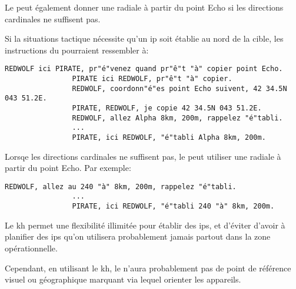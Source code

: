 \begin{e1}
\begin{e2}
\begin{e3}
			Le \ja{} peut également donner une radiale à partir du point Echo si les directions cardinales ne suffisent pas.
			
			
			\begin{e4}
				
				\begin{minipage}{\linewidth}
				\item Si la situations tactique nécessite qu'un \gls{ip} soit établie au nord de la cible, les instructions du \ja{} pourraient ressembler à:
				
				\begin{lstlisting}[caption=Keyhole: directions cardinale, label=keyholecard]
				REDWOLF ici PIRATE, pr"é"venez quand pr"ê"t "à" copier point Echo.
				PIRATE ici REDWOLF, pr"ê"t "à" copier.
				REDWOLF, coordonn"é"es point Echo suivent, 42 34.5N 043 51.2E.
				PIRATE, REDWOLF, je copie 42 34.5N 043 51.2E.
				REDWOLF, allez Alpha 8km, 200m, rappelez "é"tabli.
				...
				PIRATE, ici REDWOLF, "é"tabli Alpha 8km, 200m.
				\end{lstlisting}
				\end{minipage}
				
				\begin{minipage}{\linewidth}
				\item Lorsqe les directions cardinales ne suffisent pas, le \ja{} peut utiliser une radiale à partir du point Echo. Par exemple:
				
				\begin{lstlisting}[caption=Keyhole: radiale, label=keyholerad]
				REDWOLF, allez au 240 "à" 8km, 200m, rappelez "é"tabli.
				...
				PIRATE, ici REDWOLF, "é"tabli 240 "à" 8km, 200m.
				\end{lstlisting}
				\end{minipage}
				
			\end{e4}
			
			
			\item Le \gls{kh} permet une flexibilité illimitée pour établir des \glspl{ip}, et d'éviter d'avoir à planifier des \glspl{ip} qu'on utilisera probablement jamais partout dans la zone opérationnelle.
			
			Cependant, en utilisant le \gls{kh}, le \ja{} n'aura probablement pas de point de référence visuel ou géographique marquant via lequel orienter les appareils.
			

\end{e3}
\end{e2}
\end{e1}
